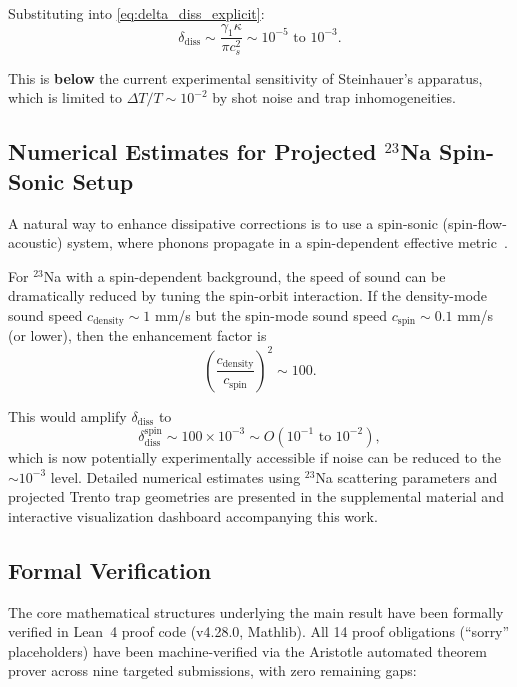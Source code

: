 \documentclass[aps,prl,twocolumn,superscriptaddress,nofootinbib,amsmath,amssymb]{revtex4-2}
\begin{document}
Substituting into \eqref{eq:delta_diss_explicit}:
\begin{equation}
\delta_{\text{diss}} \sim \frac{\gamma_1 \kappa}{\pi c_s^2} \sim 10^{-5} \text{ to } 10^{-3}.
\end{equation}

This is \textbf{below} the current experimental sensitivity of Steinhauer's apparatus, which is limited to $\Delta T / T \sim 10^{-2}$ by shot noise and trap inhomogeneities.

\subsection{Numerical Estimates for Projected $^{23}$Na Spin-Sonic Setup}

A natural way to enhance dissipative corrections is to use a spin-sonic (spin-flow-acoustic) system, where phonons propagate in a spin-dependent effective metric~\cite{Berti:2025}.

For $^{23}$Na with a spin-dependent background, the speed of sound can be dramatically reduced by tuning the spin-orbit interaction. If the density-mode sound speed $c_{\text{density}} \sim 1$ mm/s but the spin-mode sound speed $c_{\text{spin}} \sim 0.1$ mm/s (or lower), then the enhancement factor is
\begin{equation}
\label{eq:enhancement}
\left(\frac{c_{\text{density}}}{c_{\text{spin}}}\right)^2 \sim 100.
\end{equation}

This would amplify $\delta_{\text{diss}}$ to
\begin{equation}
\delta_{\text{diss}}^{\text{spin}} \sim 100 \times 10^{-3} \sim O(10^{-1} \text{ to } 10^{-2}),
\end{equation}
which is now potentially experimentally accessible if noise can be reduced to the $\sim 10^{-3}$ level. Detailed numerical estimates using $^{23}$Na scattering parameters and projected Trento trap geometries are presented in the supplemental material and interactive visualization dashboard accompanying this work.

\subsection{Formal Verification}

The core mathematical structures underlying the main result have been formally verified in Lean~4 proof code (v4.28.0, Mathlib). All 14 proof obligations (``sorry'' placeholders) have been machine-verified via the Aristotle automated theorem prover across nine targeted submissions, with zero remaining gaps:
\end{document}
